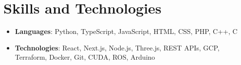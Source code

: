 \documentclass[letterpaper,11pt]{article}
\newcommand{\resumeItem}[2]{
  \item\small{
    \textbf{#1}{: #2 \vspace{1pt}}
  }
}
\newcommand{\resumeSubItem}[2]{\resumeItem{#1}{#2}\vspace{-5pt}}
\newcommand{\resumeSubHeadingListStart}{\begin{itemize}[label={},leftmargin=*]}
\newcommand{\resumeSubHeadingListEnd}{\end{itemize}}
\begin{document}
\section{Skills and Technologies}
  \resumeSubHeadingListStart
    \resumeSubItem{Languages}{Python, TypeScript, JavaScript, HTML, CSS, PHP, C++, C}
    \resumeSubItem{Technologies}{React, Next.js, Node.js, Three.js, REST APIs, GCP, Terraform, Docker, Git, CUDA, ROS, Arduino}
  \resumeSubHeadingListEnd
\end{document}

